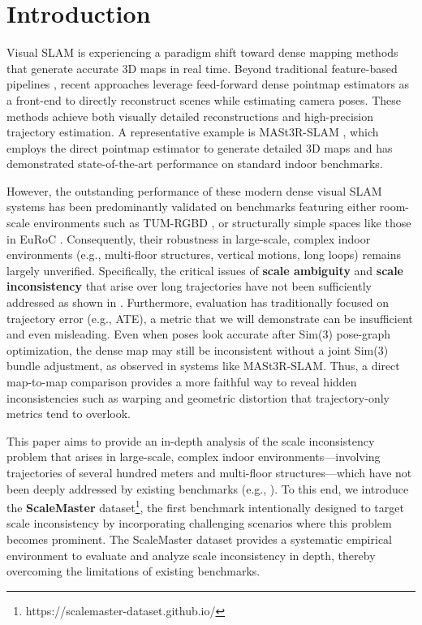 \section{Introduction} 
\label{sec:intro}

Visual \ac{SLAM} \cite{cadena2017past,ORBSLAM3_TRO,slam-handbook} is experiencing a paradigm shift toward dense mapping methods that generate accurate 3D maps in real time. Beyond traditional feature-based pipelines \cite{ORBSLAM3_TRO}, recent approaches leverage feed-forward dense pointmap estimators \cite{dust3r_cvpr24} as a front-end to directly reconstruct scenes while estimating camera poses. These methods achieve both visually detailed reconstructions and high-precision trajectory estimation. A representative example is MASt3R-SLAM \cite{murai2025mast3r}, which employs the direct pointmap estimator \cite{dust3r_cvpr24,leroy2024grounding} to generate detailed 3D maps and has demonstrated state-of-the-art performance on standard indoor benchmarks.

However, the outstanding performance of these modern dense visual SLAM systems has been predominantly validated on benchmarks featuring either room-scale environments such as TUM-RGBD \cite{sturm2012benchmark}, or structurally simple spaces like those in EuRoC \cite{burri2016euroc}. Consequently, their robustness in large-scale, complex indoor environments (e.g., multi-floor structures, vertical motions, long loops) remains largely unverified. Specifically, the critical issues of \textbf{scale ambiguity} and \textbf{scale inconsistency} that arise over long trajectories have not been sufficiently addressed as shown in . Furthermore, evaluation has traditionally focused on trajectory error (e.g., \ac{ATE}), a metric that we will demonstrate can be insufficient and even misleading. Even when poses look accurate after Sim(3) pose-graph optimization, the dense map may still be inconsistent without a joint Sim(3) bundle adjustment, as observed in systems like MASt3R-SLAM. Thus, a direct map-to-map comparison provides a more faithful way to reveal hidden inconsistencies such as warping and geometric distortion that trajectory-only metrics tend to overlook.

This paper aims to provide an in-depth analysis of the scale inconsistency problem that arises in large-scale, complex indoor environments—involving trajectories of several hundred meters and multi-floor structures—which have not been deeply addressed by existing benchmarks (e.g., \cite{sturm2012benchmark,burri2016euroc,glocker2013real}). To this end, we introduce the \textbf{ScaleMaster} dataset\footnote{https://scalemaster-dataset.github.io/}, the first benchmark intentionally designed to target scale inconsistency by incorporating challenging scenarios where this problem becomes prominent. The ScaleMaster dataset provides a systematic empirical environment to evaluate and analyze scale inconsistency in depth, thereby overcoming the limitations of existing benchmarks.


